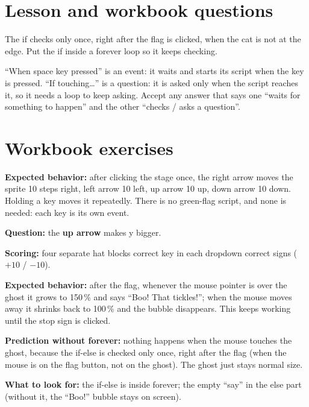 
\section{Lesson and workbook questions}
\begin{answer}
The if checks only once, right after the flag is clicked, when the cat is not at the edge. Put the if inside a forever loop so it keeps checking.
\end{answer}

\begin{answer}
\enquote{When space key pressed} is an event: it waits and starts its script when the key is pressed. \enquote{If touching\ldots} is a question: it is asked only when the script reaches it, so it needs a loop to keep asking. Accept any answer that says one \enquote{waits for something to happen} and the other \enquote{checks / asks a question}.
\end{answer}

\section{Workbook exercises}
\begin{answer}
\textbf{Expected behavior:} after clicking the stage once, the right arrow moves the sprite 10 steps right, left arrow 10 left, up arrow 10 up, down arrow 10 down. Holding a key moves it repeatedly. There is no green-flag script, and none is needed: each key is its own event.

\textbf{Question:} the \textbf{up arrow} makes y bigger.

\textbf{Scoring:} \tickbox{} four separate hat blocks \quad \tickbox{} correct key in each dropdown \quad \tickbox{} correct signs ($+10$ / $-10$).
\end{answer}

\begin{answer}
\textbf{Expected behavior:} after the flag, whenever the mouse pointer is over the ghost it grows to 150\,\% and says \enquote{Boo! That tickles!}; when the mouse moves away it shrinks back to 100\,\% and the bubble disappears. This keeps working until the stop sign is clicked.

\textbf{Prediction without forever:} nothing happens when the mouse touches the ghost, because the if-else is checked only once, right after the flag (when the mouse is on the flag button, not on the ghost). The ghost just stays normal size.

\textbf{What to look for:} the if-else is inside forever; the empty \enquote{say} in the else part (without it, the \enquote{Boo!} bubble stays on screen).
\end{answer}

